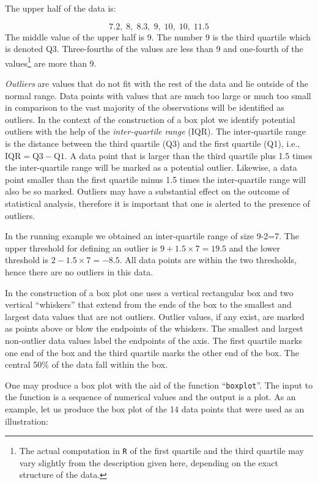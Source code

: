 \documentclass[]{krantz}
\theoremstyle{definition}
\theoremstyle{definition}
\theoremstyle{definition}
\theoremstyle{remark}
\begin{document}
The upper half of the data is:

\[7.2,\;   8,\;   8.3,\;   9,\;   10,\;   10,\;   11.5\] The middle
value of the upper half is 9. The number 9 is the third quartile which
is denoted Q3. Three-fourths of the values are less than 9 and
one-fourth of the values\footnote{The actual computation in \texttt{R}
  of the first quartile and the third quartile may vary slightly from
  the description given here, depending on the exact structure of the
  data.} are more than 9.

\emph{Outliers} are values that do not fit with the rest of the data and
lie outside of the normal range. Data points with values that are much
too large or much too small in comparison to the vast majority of the
observations will be identified as outliers. In the context of the
construction of a box plot we identify potential outliers with the help
of the \emph{inter-quartile range} (IQR). The inter-quartile range is
the distance between the third quartile (Q3) and the first quartile
(Q1), i.e., \(\mbox{IQR} = \mbox{Q3} - \mbox{Q1}\). A data point that is
larger than the third quartile plus 1.5 times the inter-quartile range
will be marked as a potential outlier. Likewise, a data point smaller
than the first quartile minus 1.5 times the inter-quartile range will
also be so marked. Outliers may have a substantial effect on the outcome
of statistical analysis, therefore it is important that one is alerted
to the presence of outliers.

In the running example we obtained an inter-quartile range of size
9-2=7. The upper threshold for defining an outlier is
\(9+1.5 \times 7 = 19.5\) and the lower threshold is
\(2-1.5 \times 7 = -8.5\). All data points are within the two
thresholds, hence there are no outliers in this data.

In the construction of a box plot one uses a vertical rectangular box
and two vertical ``whiskers'' that extend from the ends of the box to
the smallest and largest data values that are not outliers. Outlier
values, if any exist, are marked as points above or blow the endpoints
of the whiskers. The smallest and largest non-outlier data values label
the endpoints of the axis. The first quartile marks one end of the box
and the third quartile marks the other end of the box. The central 50\%
of the data fall within the box.

One may produce a box plot with the aid of the function
``\texttt{boxplot}''. The input to the function is a sequence of
numerical values and the output is a plot. As an example, let us produce
the box plot of the 14 data points that were used as an illustration:
\end{document}
